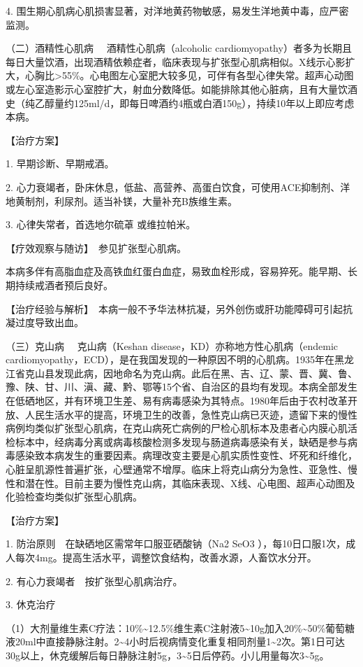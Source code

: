 4.
围生期心肌病心肌损害显著，对洋地黄药物敏感，易发生洋地黄中毒，应严密监测。

{（二）酒精性心肌病} 　酒精性心肌病（alcoholic
cardiomyopathy）者多为长期且每日大量饮酒，出现酒精依赖症者，临床表现与扩张型心肌病相似。X线示心影扩大，心胸比\textgreater{}55\%。心电图左心室肥大较多见，可伴有各型心律失常。超声心动图或左心室造影示心室腔扩大，射血分数降低。如能排除其他心脏病，且有大量饮酒史（纯乙醇量约125ml/d，即每日啤酒约4瓶或白酒150g），持续10年以上即应考虑本病。

【治疗方案】

1. 早期诊断、早期戒酒。

2.
心力衰竭者，卧床休息，低盐、高营养、高蛋白饮食，可使用ACE抑制剂、洋地黄制剂，利尿剂。适当补镁，大量补充B族维生素。

3. 心律失常者，首选地尔硫䓬
或维拉帕米。

【疗效观察与随访】　参见扩张型心肌病。

本病多伴有高脂血症及高铁血红蛋白血症，易致血栓形成，容易猝死。能早期、长期持续戒酒者预后良好。

【治疗经验与解析】　本病一般不予华法林抗凝，另外创伤或肝功能障碍可引起抗凝过度导致出血。

{（三）克山病} 　克山病（Keshan disease，KD）亦称地方性心肌病（endemic
cardiomyopathy，ECD），是在我国发现的一种原因不明的心肌病。1935年在黑龙江省克山县发现此病，因地命名为克山病。此后在黑、吉、辽、蒙、晋、冀、鲁、豫、陕、甘、川、滇、藏、黔、鄂等15个省、自治区的县均有发现。本病全部发生在低硒地区，并有环境卫生差、易有病毒感染为其特点。1980年后由于农村改革开放、人民生活水平的提高，环境卫生的改善，急性克山病已灭迹，遗留下来的慢性病例均类似扩张型心肌病，在克山病死亡病例的尸检心肌标本及患者心内膜心肌活检标本中，经病毒分离或病毒核酸检测多发现与肠道病毒感染有关，缺硒是参与病毒感染致本病发生的重要因素。病理改变主要是心肌实质性变性、坏死和纤维化，心脏呈肌源性普遍扩张，心壁通常不增厚。临床上将克山病分为急性、亚急性、慢性和潜在性。目前主要为慢性克山病，其临床表现、X线、心电图、超声心动图及化验检查均类似扩张型心肌病。

【治疗方案】

1. 防治原则　在缺硒地区需常年口服亚硒酸钠（Na{2} SeO{3}
），每10日口服1次，成人每次4mg。提高生活水平，调整饮食结构，改善水源，人畜饮水分开。

2. 有心力衰竭者　按扩张型心肌病治疗。

3. 休克治疗

（1）大剂量维生素C疗法：10\%\textasciitilde{}12.5\%维生素C注射液5\textasciitilde{}10g加入20\%\textasciitilde{}50\%葡萄糖液20ml中直接静脉注射。2\textasciitilde{}4小时后视病情变化重复相同剂量1\textasciitilde{}2次。第1日可达30g以上，休克缓解后每日静脉注射5g，3\textasciitilde{}5日后停药。小儿用量每次3\textasciitilde{}5g。

